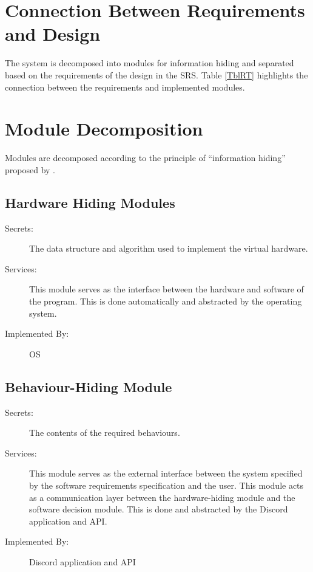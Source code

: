 \documentclass[12pt, titlepage]{article}
\begin{document}
\section{Connection Between Requirements and Design} \label{SecConnection}

The system is decomposed into modules for information hiding and separated based on the requirements of the design in the SRS. Table \ref{TblRT} highlights the connection between the requirements and implemented modules. 

\section{Module Decomposition} \label{SecMD}

Modules are decomposed according to the principle of ``information hiding''
proposed by \citet{ParnasEtAl1984}.

\subsection{Hardware Hiding Modules}


\begin{description}
\item[Secrets:]The data structure and algorithm used to implement the virtual
  hardware.
\item[Services:]This module serves as the interface between the hardware and software of the program. This is done automatically and abstracted by the operating system.
\item[Implemented By:] OS
\end{description}

\subsection{Behaviour-Hiding Module}

\begin{description}
\item[Secrets:]The contents of the required behaviours.
\item[Services:]This module serves as the external interface between the system specified by the software requirements specification and the user. This module acts as a communication layer between the hardware-hiding module and the software decision module. This is done and abstracted by the Discord application and API. 
\item[Implemented By:] Discord application and API
\end{description}
\end{document}
